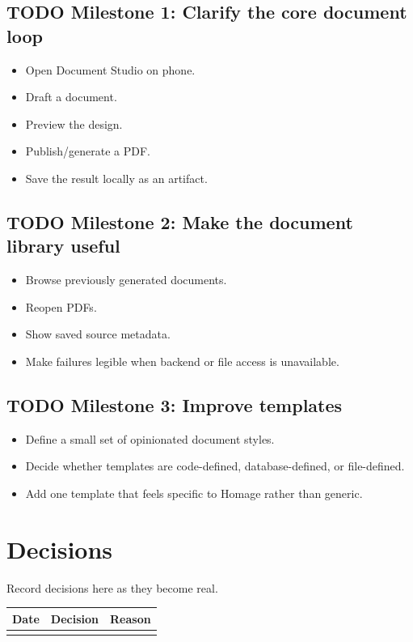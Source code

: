 \documentclass[11pt]{article}
\begin{document}
\subsection{{\bfseries\sffamily TODO} Milestone 1: Clarify the core document loop}
\label{sec:orgd6d9d7f}

\begin{itemize}
\item Open Document Studio on phone.
\item Draft a document.
\item Preview the design.
\item Publish/generate a PDF.
\item Save the result locally as an artifact.
\end{itemize}
\subsection{{\bfseries\sffamily TODO} Milestone 2: Make the document library useful}
\label{sec:org41ad217}

\begin{itemize}
\item Browse previously generated documents.
\item Reopen PDFs.
\item Show saved source metadata.
\item Make failures legible when backend or file access is unavailable.
\end{itemize}
\subsection{{\bfseries\sffamily TODO} Milestone 3: Improve templates}
\label{sec:orgd6b5d76}

\begin{itemize}
\item Define a small set of opinionated document styles.
\item Decide whether templates are code-defined, database-defined, or file-defined.
\item Add one template that feels specific to Homage rather than generic.
\end{itemize}
\section{Decisions}
\label{sec:org4952282}

Record decisions here as they become real.

\begin{center}
\begin{tabular}{lll}
Date & Decision & Reason\\
\hline
 &  & \\
\end{tabular}
\end{center}
\end{document}
